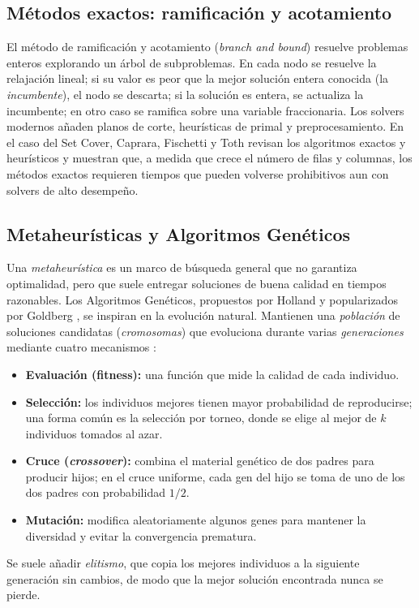\subsection{Métodos exactos: ramificación y acotamiento}
El método de ramificación y acotamiento (\textit{branch and bound}) \cite{landdoig60} resuelve problemas enteros explorando un árbol de subproblemas. En cada nodo se resuelve la relajación lineal; si su valor es peor que la mejor solución entera conocida (la \textit{incumbente}), el nodo se descarta; si la solución es entera, se actualiza la incumbente; en otro caso se ramifica sobre una variable fraccionaria. Los solvers modernos añaden planos de corte, heurísticas de primal y preprocesamiento. En el caso del Set Cover, Caprara, Fischetti y Toth \cite{caprara00} revisan los algoritmos exactos y heurísticos y muestran que, a medida que crece el número de filas y columnas, los métodos exactos requieren tiempos que pueden volverse prohibitivos aun con solvers de alto desempeño.

\subsection{Metaheurísticas y Algoritmos Genéticos}
Una \textit{metaheurística} es un marco de búsqueda general que no garantiza optimalidad, pero que suele entregar soluciones de buena calidad en tiempos razonables. Los Algoritmos Genéticos, propuestos por Holland \cite{holland75} y popularizados por Goldberg \cite{goldberg89}, se inspiran en la evolución natural. Mantienen una \textit{población} de soluciones candidatas (\textit{cromosomas}) que evoluciona durante varias \textit{generaciones} mediante cuatro mecanismos \cite{eiben15}:
\begin{itemize}
\item \textbf{Evaluación (fitness):} una función que mide la calidad de cada individuo.
\item \textbf{Selección:} los individuos mejores tienen mayor probabilidad de reproducirse; una forma común es la selección por torneo, donde se elige al mejor de $k$ individuos tomados al azar.
\item \textbf{Cruce (\textit{crossover}):} combina el material genético de dos padres para producir hijos; en el cruce uniforme, cada gen del hijo se toma de uno de los dos padres con probabilidad $1/2$.
\item \textbf{Mutación:} modifica aleatoriamente algunos genes para mantener la diversidad y evitar la convergencia prematura.
\end{itemize}
Se suele añadir \textit{elitismo}, que copia los mejores individuos a la siguiente generación sin cambios, de modo que la mejor solución encontrada nunca se pierde.

